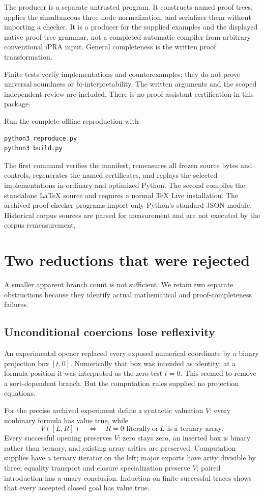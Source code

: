 \documentclass[11pt,letterpaper]{article}
\theoremstyle{definition}\newtheorem{definition}[theorem]{Definition}
\theoremstyle{remark}\newtheorem{remark}[theorem]{Remark}
\begin{document}
The producer is a separate untrusted program. It constructs named proof
trees, applies the simultaneous three-node normalization, and serializes
them without importing a checker. It is a producer for the supplied
examples and the displayed native proof-tree grammar, not a completed
automatic compiler from arbitrary conventional iPRA input. General
completeness is the written proof transformation.

Finite tests verify implementations and counterexamples; they do not
prove universal soundness or bi-interpretability. The written arguments
and the scoped independent review are included. There is no proof-assistant
certification in this package.

Run the complete offline reproduction with
\begin{lstlisting}
python3 reproduce.py
python3 build.py
\end{lstlisting}
The first command verifies the manifest, remeasures all frozen source
bytes and controls, regenerates the named certificates, and replays the
selected implementations in ordinary and optimized Python. The second
compiles the standalone LaTeX source and requires a normal TeX Live
installation. The archived proof-checker programs import only Python's
standard JSON module. Historical corpus sources are parsed for
measurement and are not executed by the corpus remeasurement.

\section{Two reductions that were rejected}
\label{sec:failed}

A smaller apparent branch count is not sufficient. We retain two
separate obstructions because they identify actual mathematical and
proof-completeness failures.

\subsection{Unconditional coercions lose reflexivity}

An experimental opener replaced every exposed numerical coordinate by
a binary projection box $[t,0]$. Numerically that box was intended as
identity; at a formula position it was interpreted as the zero test
$t=0$. This seemed to remove a sort-dependent branch. But the computation
rules supplied no projection equations.

For the precise archived experiment define a syntactic valuation $V$:
every nonbinary formula has value true, while
\[
 V([L,R])\quad\Longleftrightarrow\quad
 R=0\text{ literally}\ \text{or}\ L\text{ is a ternary array}.
\]
Every successful opening preserves $V$: zero stays zero, an inserted
box is binary rather than ternary, and existing array arities are
preserved. Computation supplies have a ternary iterator on the left;
major exports have arity divisible by three; equality transport and
closure specialization preserve $V$; paired introduction has a unary
conclusion. Induction on finite successful traces shows that every
accepted closed goal has value true.
\end{document}
